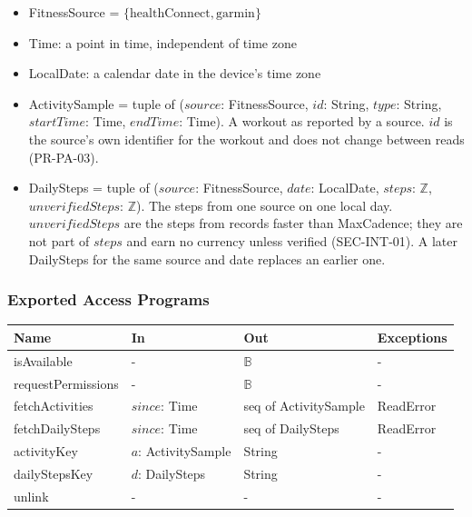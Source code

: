 \documentclass[12pt, titlepage]{article}
\begin{document}
\begin{itemize}
\item FitnessSource = $\{\mathrm{healthConnect}, \mathrm{garmin}\}$
\item Time: a point in time, independent of time zone
\item LocalDate: a calendar date in the device's time zone
\item ActivitySample = tuple of ($\mathit{source}$: FitnessSource,
  $\mathit{id}$: String, $\mathit{type}$: String, $\mathit{startTime}$: Time,
  $\mathit{endTime}$: Time). A workout as reported by a source.
  $\mathit{id}$ is the source's own identifier for the workout and does not
  change between reads (PR-PA-03).
\item DailySteps = tuple of ($\mathit{source}$: FitnessSource,
  $\mathit{date}$: LocalDate, $\mathit{steps}$: $\mathbb{Z}$,\linebreak
  $\mathit{unverifiedSteps}$: $\mathbb{Z}$). The steps from one source on one
  local day. $\mathit{unverifiedSteps}$ are the steps from records faster
  than \textsf{MaxCadence}; they are not part of $\mathit{steps}$ and earn no
  currency unless verified (SEC-INT-01). A later DailySteps for the same
  source and date replaces an earlier one.
\end{itemize}

\subsubsection{Exported Access Programs}

\begin{center}
\renewcommand{\arraystretch}{1.2}
\begin{tabular}{>{\raggedright\arraybackslash}p{3.6cm}
  >{\raggedright\arraybackslash}p{3.6cm}
  >{\raggedright\arraybackslash}p{4cm}
  >{\raggedright\arraybackslash}p{2.7cm}}
\toprule
\textbf{Name} & \textbf{In} & \textbf{Out} & \textbf{Exceptions} \\
\midrule
isAvailable & - & $\mathbb{B}$ & - \\
requestPermissions & - & $\mathbb{B}$ & - \\
fetchActivities & $\mathit{since}$: Time & seq of ActivitySample &
  ReadError \\
fetchDailySteps & $\mathit{since}$: Time & seq of DailySteps & ReadError \\
activityKey & $\mathit{a}$: ActivitySample & String & - \\
dailyStepsKey & $\mathit{d}$: DailySteps & String & - \\
unlink & - & - & - \\
\bottomrule
\end{tabular}
\end{center}
\end{document}

